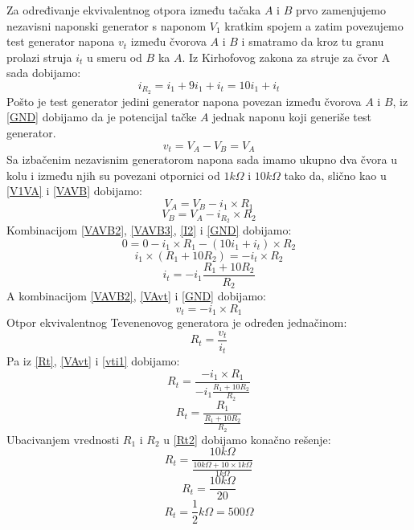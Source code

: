 \documentclass{article}
\begin{document}
    Za određivanje ekvivalentnog otpora između tačaka $A$ i $B$ prvo zamenjujemo nezavisni naponski generator s naponom $V_1$ kratkim spojem a zatim povezujemo test generator napona $v_t$ između čvorova $A$ i $B$ i smatramo da kroz tu granu prolazi struja $i_t$ u smeru od $B$ ka $A$. Iz Kirhofovog zakona za struje za čvor A sada dobijamo:
    \begin{equation}
        \label{I2}
        i_{R_2} = i_1 + 9i_1 + i_t = 10i_1 + i_t
    \end{equation}
    Pošto je test generator jedini generator napona povezan između čvorova $A$ i $B$, iz \eqref{GND} dobijamo da je potencijal tačke $A$ jednak naponu koji generiše test generator.
    \begin{equation}
        \label{VAvt}
        v_t = V_A - V_B = V_A
    \end{equation}
    Sa izbačenim nezavisnim generatorom napona sada imamo ukupno dva čvora u kolu i između njih su povezani otpornici od $1k\Omega$ i $10k\Omega$ tako da, slično kao u \eqref{V1VA} i \eqref{VAVB} dobijamo:
    \begin{equation}
        \label{VAVB2}
        V_A = V_B - i_1 \times R_1
    \end{equation}
    \begin{equation}
        \label{VAVB3}
        V_B = V_A - i_{R_2} \times R_2
    \end{equation}
    Kombinacijom \eqref{VAVB2}, \eqref{VAVB3}, \eqref{I2} i \eqref{GND} dobijamo:
    $$0 = 0 - i_1 \times R_1 - (10i_1 + i_t) \times R_2$$
    $$i_1 \times (R_1 + 10R_2) = -i_t \times R_2$$
    \begin{equation}
        \label{it}
        i_t = -i_1\frac{R_1 + 10R_2}{R_2}
    \end{equation}
    A kombinacijom \eqref{VAVB2}, \eqref{VAvt} i \eqref{GND} dobijamo:
    \begin{equation}
        \label{vti1}
        v_t = -i_1 \times R_1
    \end{equation}
    Otpor ekvivalentnog Tevenenovog generatora je određen jednačinom:
    \begin{equation}
        \label{Rt}
        R_t = \frac{v_t}{i_t}
    \end{equation}
    Pa iz \eqref{Rt}, \eqref{VAvt} i \eqref{vti1} dobijamo:
    $$R_t = \frac{-i_1 \times R_1}{-i_1\frac{R_1 + 10R_2}{R_2}}$$
    \begin{equation}
        \label{Rt2}
        R_t = \frac{R_1}{\frac{R_1 + 10R_2}{R_2}}
    \end{equation}
    Ubacivanjem vrednosti $R_1$ i $R_2$ u \eqref{Rt2} dobijamo konačno rešenje:
    $$R_t = \frac{10k\Omega}{\frac{10k\Omega + 10 \times 1k\Omega}{1k\Omega}}$$
    $$R_t = \frac{10k\Omega}{20}$$
    $$R_t = \frac{1}{2}k\Omega = 500\Omega$$
\end{document}
